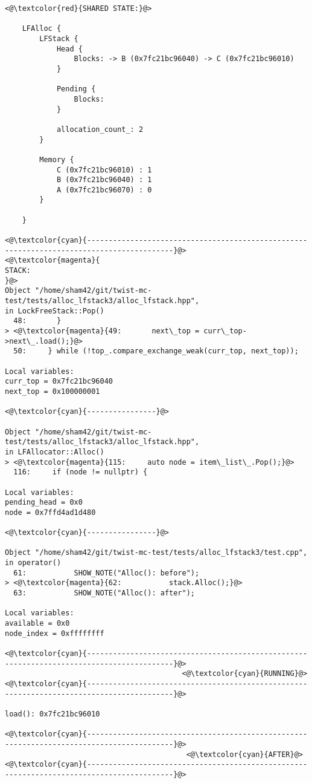 \begin{adjustwidth}{-3.3cm}{-1cm}
\begin{allintypewriter}
\begin{multicols*}{2}
\begin{lstlisting}[numbers=none]
<@\textcolor{red}{SHARED STATE:}@>

    LFAlloc {
	    LFStack {
		    Head {
			    Blocks: -> B (0x7fc21bc96040) -> C (0x7fc21bc96010) 
		    }

		    Pending {
			    Blocks: 
		    }

		    allocation_count_: 2
	    }

	    Memory {
		    C (0x7fc21bc96010) : 1
		    B (0x7fc21bc96040) : 1
		    A (0x7fc21bc96070) : 0
	    }

    }

<@\textcolor{cyan}{------------------------------------------------------------------------------------------}@>
<@\textcolor{magenta}{
STACK:
}@>
Object "/home/sham42/git/twist-mc-test/tests/alloc_lfstack3/alloc_lfstack.hpp",
in LockFreeStack::Pop()
  48:       }
> <@\textcolor{magenta}{49:       next\_top = curr\_top->next\_.load();}@>
  50:     } while (!top_.compare_exchange_weak(curr_top, next_top));

Local variables: 
curr_top = 0x7fc21bc96040
next_top = 0x100000001

<@\textcolor{cyan}{----------------}@>

Object "/home/sham42/git/twist-mc-test/tests/alloc_lfstack3/alloc_lfstack.hpp",
in LFAllocator::Alloc()
> <@\textcolor{magenta}{115:     auto node = item\_list\_.Pop();}@>
  116:     if (node != nullptr) {

Local variables: 
pending_head = 0x0
node = 0x7ffd4ad1d480

<@\textcolor{cyan}{----------------}@>

Object "/home/sham42/git/twist-mc-test/tests/alloc_lfstack3/test.cpp",
in operator()
  61:           SHOW_NOTE("Alloc(): before");
> <@\textcolor{magenta}{62:           stack.Alloc();}@>
  63:           SHOW_NOTE("Alloc(): after");

Local variables: 
available = 0x0
node_index = 0xffffffff

<@\textcolor{cyan}{------------------------------------------------------------------------------------------}@>
                                         <@\textcolor{cyan}{RUNNING}@>
<@\textcolor{cyan}{------------------------------------------------------------------------------------------}@>

load(): 0x7fc21bc96010

<@\textcolor{cyan}{------------------------------------------------------------------------------------------}@>
                                          <@\textcolor{cyan}{AFTER}@>
<@\textcolor{cyan}{------------------------------------------------------------------------------------------}@>


\end{lstlisting}
\end{multicols*}
\end{allintypewriter}
\end{adjustwidth}

